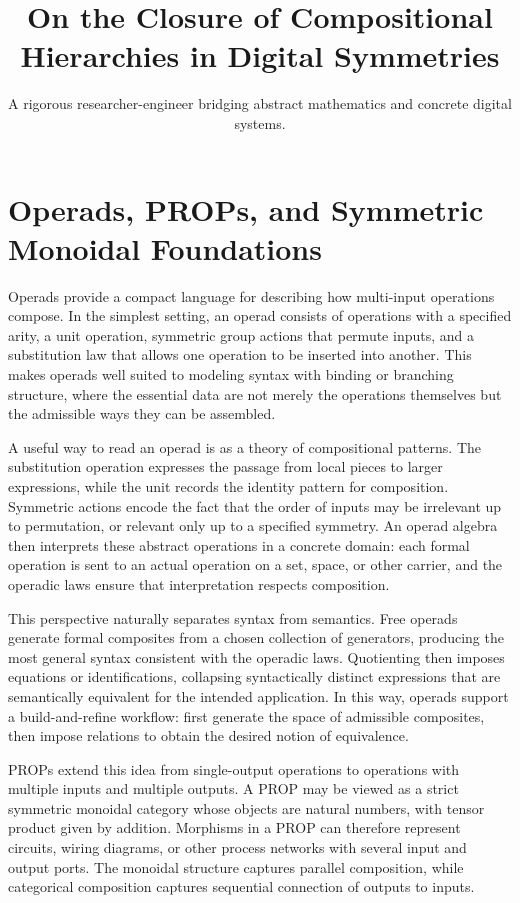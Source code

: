 \documentclass[11pt]{article}
\title{On the Closure of Compositional Hierarchies in Digital Symmetries}
\author{A rigorous researcher-engineer bridging abstract mathematics and concrete digital systems.}
\begin{document}
\section*{Operads, PROPs, and Symmetric Monoidal Foundations}

Operads provide a compact language for describing how multi-input operations compose. In the simplest setting, an operad consists of operations with a specified arity, a unit operation, symmetric group actions that permute inputs, and a substitution law that allows one operation to be inserted into another. This makes operads well suited to modeling syntax with binding or branching structure, where the essential data are not merely the operations themselves but the admissible ways they can be assembled.

A useful way to read an operad is as a theory of compositional patterns. The substitution operation expresses the passage from local pieces to larger expressions, while the unit records the identity pattern for composition. Symmetric actions encode the fact that the order of inputs may be irrelevant up to permutation, or relevant only up to a specified symmetry. An operad algebra then interprets these abstract operations in a concrete domain: each formal operation is sent to an actual operation on a set, space, or other carrier, and the operadic laws ensure that interpretation respects composition.

This perspective naturally separates syntax from semantics. Free operads generate formal composites from a chosen collection of generators, producing the most general syntax consistent with the operadic laws. Quotienting then imposes equations or identifications, collapsing syntactically distinct expressions that are semantically equivalent for the intended application. In this way, operads support a build-and-refine workflow: first generate the space of admissible composites, then impose relations to obtain the desired notion of equivalence.

PROPs extend this idea from single-output operations to operations with multiple inputs and multiple outputs. A PROP may be viewed as a strict symmetric monoidal category whose objects are natural numbers, with tensor product given by addition. Morphisms in a PROP can therefore represent circuits, wiring diagrams, or other process networks with several input and output ports. The monoidal structure captures parallel composition, while categorical composition captures sequential connection of outputs to inputs.
\end{document}
